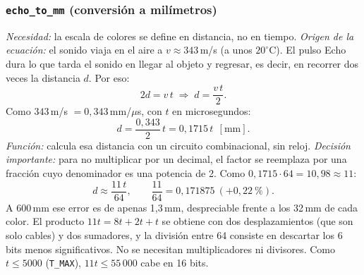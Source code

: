 \documentclass[conference]{IEEEtran}
\newcommand{\mo}[1]{\texttt{#1}}
\begin{document}
\subsubsection{\mo{echo\_to\_mm} (conversión a milímetros)}
\emph{Necesidad:} la escala de colores se define en distancia, no en tiempo.
\emph{Origen de la ecuación:} el sonido viaja en el aire a $v \approx 343$\,m/s (a unos $20^\circ$C). El pulso Echo dura lo que tarda el sonido en llegar al objeto y regresar, es decir, en recorrer dos veces la distancia $d$. Por eso:
\begin{equation}
2d = v\,t \;\Rightarrow\; d = \frac{v\,t}{2}.
\end{equation}
Como $343$\,m/s $= 0{,}343$\,mm/$\mu$s, con $t$ en microsegundos:
\begin{equation}
d = \frac{0{,}343}{2}\,t = 0{,}1715\,t \ \ [\text{mm}].
\end{equation}
\emph{Función:} calcula esa distancia con un circuito combinacional, sin reloj.
\emph{Decisión importante:} para no multiplicar por un decimal, el factor se reemplaza por una fracción cuyo denominador es una potencia de 2. Como $0{,}1715 \cdot 64 = 10{,}98 \approx 11$:
\begin{equation}
d \approx \frac{11\,t}{64}, \qquad \frac{11}{64} = 0{,}171875 \ (+0{,}22\ \text{\%}).
\end{equation}
A 600\,mm ese error es de apenas 1,3\,mm, despreciable frente a los 32\,mm de cada color. El producto $11t = 8t + 2t + t$ se obtiene con dos desplazamientos (que son solo cables) y dos sumadores, y la división entre 64 consiste en descartar los 6 bits menos significativos. No se necesitan multiplicadores ni divisores. Como $t \leq 5000$ (\mo{T\_MAX}), $11t \leq 55\,000$ cabe en 16 bits.
\end{document}
